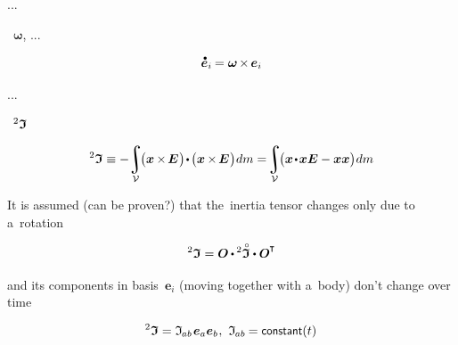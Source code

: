 ...

  ~$\bm{\omega}$, ...

\[
\mathdotabove{\bm{e}}_i \hspace{-0.16ex}
= \bm{\omega} \hspace{-0.2ex} \times \hspace{-0.2ex} \bm{e}_i
\]

...

~${\inertiatensor}$

\nopagebreak\begin{equation*}
\inertiatensor
\equiv
- \hspace{-0.4ex} \integral_{\mathcal{V}} \hspace{-0.4ex} \bigl( \bm{x} \hspace{-0.1ex} \times \hspace{-0.22ex} \UnitDyad \hspace{.1ex} \bigr) \hspace{-0.3ex} \dotp \hspace{-0.2ex} \bigl( \bm{x} \hspace{-0.1ex} \times \hspace{-0.22ex} \UnitDyad \hspace{.1ex} \bigr) \hspace{.1ex} dm
=
\hspace{-0.4ex} \integral_{\mathcal{V}} \hspace{-0.4ex} \bigl( \bm{x} \narrowdotp \bm{x} \UnitDyad - \bm{x} \bm{x} \bigr) \hspace{.1ex} dm
\end{equation*}

It is assumed (can be proven?) that the~inertia tensor changes only due to a~rotation

\vspace{-0.1em}\begin{equation*}
\inertiatensor = \rotationtensor \hspace{-0.1ex} \dotp \inertiatensorcircabove \dotp \rotationtensor^{\hspace{-0.1ex}\T}
\end{equation*}

\vspace{-0.1em}\noindent
and its components in basis~${\bm{e}_i}$ (moving together with a~body) don’t change over time

\nopagebreak\vspace{-0.1em}\begin{equation*}
\inertiatensor = \inertiatensorcomponents{ab} \hspace{.1ex} \bm{e}_a \bm{e}_b
\hspace{.1ex} , \hspace{.8ex}
\inertiatensorcomponents{ab} \hspace{-0.2ex} = \constant(t)
\vspace{-0.2em}
\end{equation*}

